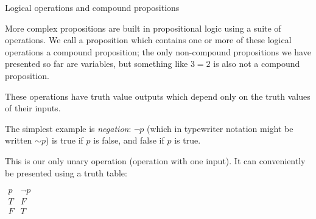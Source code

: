 \documentclass{slides}
\begin{document}
\begin{slide}

{\Large Logical operations and compound propositions}

More complex propositions are built in propositional logic using a suite of operations.  We call a proposition which contains one or more of these logical operations a compound proposition;  the only non-compound propositions we have presented so far are variables, but something like $3=2$ is also not a compound proposition.



\end{slide}

\begin{slide}

These operations have truth value outputs which depend only on the truth values of their inputs.

The simplest example is {\em negation\/}:  $\neg p$ (which in typewriter notation might be written $\sim p$)
is true if $p$ is false, and false if $p$ is true.

This is our only unary operation (operation with one input).  It can conveniently be presented using a truth table:

$\begin{array}{c|c}
p & \neg p \\ \hline

T & F \\

F & T \\

\end{array}$


\end{slide}
\end{document}
